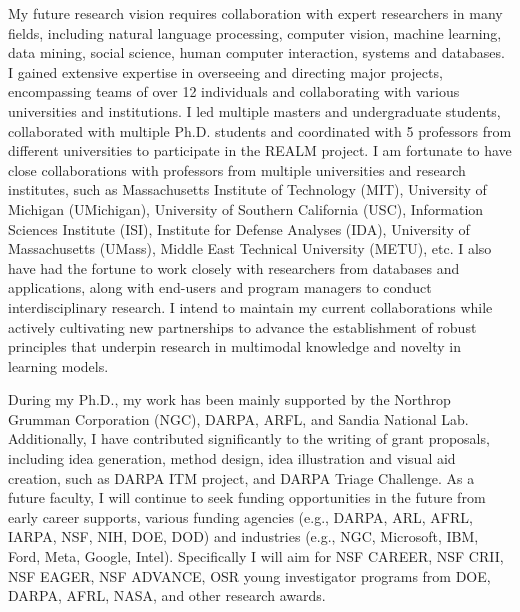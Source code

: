 My future research vision requires collaboration with expert researchers in many
fields, including natural language processing, computer vision, machine learning, data mining, social science, human computer interaction, systems and databases. 
I gained extensive expertise in overseeing and directing major projects, encompassing teams of over 12 individuals and collaborating with various universities and institutions.
I led multiple masters and undergraduate students, collaborated with multiple Ph.D. students and coordinated with 5 professors from different universities to participate in the REALM project. I am fortunate to have close collaborations with professors from multiple universities and research institutes, such as Massachusetts Institute of Technology (MIT), University of Michigan (UMichigan), University of Southern California (USC), Information Sciences Institute (ISI), Institute for Defense Analyses (IDA), University of Massachusetts (UMass), Middle East Technical University (METU), etc. I also have had the fortune to work closely with researchers from databases and applications, along with end-users and program managers to conduct interdisciplinary research. 
I intend to maintain my current collaborations while actively cultivating new partnerships to advance the establishment of robust principles that underpin research in multimodal knowledge and novelty in learning models.

During my Ph.D., my work has been mainly supported by the Northrop Grumman Corporation (NGC), 
DARPA, ARFL, and Sandia National Lab. 
Additionally, I have contributed significantly to the writing of grant proposals, including idea
generation, method design, idea illustration and visual aid creation, such as 
DARPA ITM project, and DARPA Triage Challenge.
As a future faculty, I will continue to seek funding opportunities in the future from early career supports, various funding agencies (e.g., DARPA, ARL, AFRL, IARPA, NSF, NIH, DOE, DOD) and industries (e.g., NGC, Microsoft, IBM, Ford, Meta, Google, Intel).
Specifically I will aim for NSF CAREER, NSF CRII, NSF EAGER, NSF ADVANCE, OSR young investigator programs from DOE, DARPA, AFRL, NASA, and other research awards.









